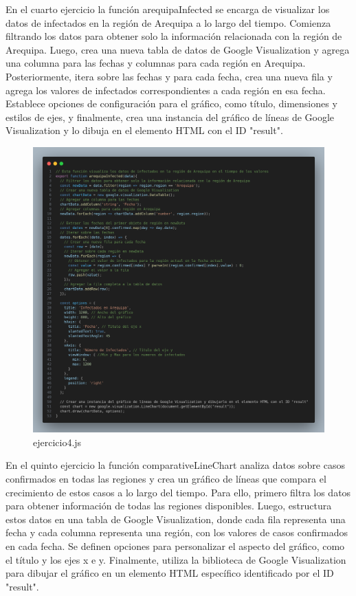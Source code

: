 En el cuarto ejercicio la función arequipaInfected se encarga de visualizar los datos de infectados en la región de Arequipa a lo largo del tiempo. Comienza filtrando los datos para obtener solo la información relacionada con la región de Arequipa. Luego, crea una nueva tabla de datos de Google Visualization y agrega una columna para las fechas y columnas para cada región en Arequipa. Posteriormente, itera sobre las fechas y para cada fecha, crea una nueva fila y agrega los valores de infectados correspondientes a cada región en esa fecha. Establece opciones de configuración para el gráfico, como título, dimensiones y estilos de ejes, y finalmente, crea una instancia del gráfico de líneas de Google Visualization y lo dibuja en el elemento HTML con el ID "result".
\begin{figure}[H]
  \centering
  \includegraphics[width=1.0\textwidth]{img/4_js.png}
  \caption{ejercicio4.js}
\end{figure}
En el quinto ejercicio la función comparativeLineChart analiza datos sobre casos confirmados en todas las regiones y crea un gráfico de líneas que compara el crecimiento de estos casos a lo largo del tiempo. Para ello, primero filtra los datos para obtener información de todas las regiones disponibles. Luego, estructura estos datos en una tabla de Google Visualization, donde cada fila representa una fecha y cada columna representa una región, con los valores de casos confirmados en cada fecha. Se definen opciones para personalizar el aspecto del gráfico, como el título y los ejes x e y. Finalmente, utiliza la biblioteca de Google Visualization para dibujar el gráfico en un elemento HTML específico identificado por el ID "result".
